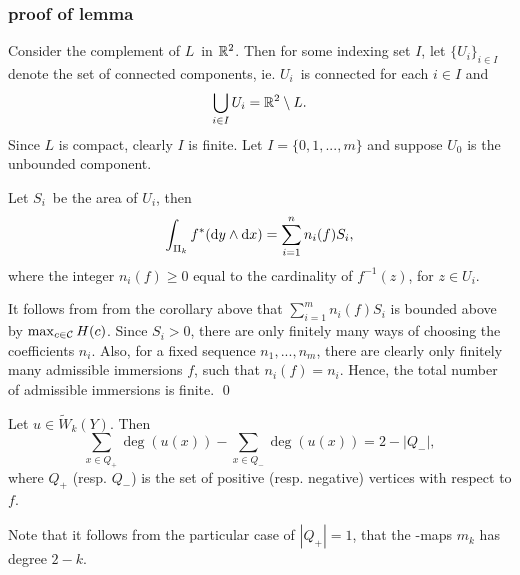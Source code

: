 \subsubsection{proof of lemma }
Consider the complement of $L$ in $\mathbb{R}^2$. Then for some indexing set $I$, let
$\{U_i\}_{i\in I}$ denote the set of connected components, ie. $U_i$ is
connected for each $i\in I$ and 
\[ \bigcup_{i \in I} U_i = \mathbb{R}^2 \setminus L. \]
Since $L$ is compact, clearly $I$ is finite. Let $I = \{0,1,...,m\}$ and suppose
$U_0$ is the unbounded component.  

Let $S_i$ be the area of $U_i$, then 
\[ \int_{\Pi_k} f^*(\mathrm{d} y \wedge \mathrm{d} x) = \sum_{i=1}^n n_i(f) S_i, \] 
where the integer $n_i(f) \ge 0$ equal to the cardinality of
$f^{-1}(z)$, for $z \in U_i$.

It follows from from the corollary above that $\sum_{i=1}^m n_i(f) S_i$ is
bounded above by $\max_{c\in \mathcal{C}} H(c)$. Since $S_i > 0$, there are only finitely many
ways of choosing the coefficients $n_i$. Also, for a fixed sequence $n_1, ...,
n_m$, there are clearly only finitely many admissible immersions $f$, such that
$n_i(f) = n_i$. Hence, the total number of admissible immersions is finite.
\qed %

\begin{lemma}
\label{prop:deg_sum}
Let $u \in \tilde{W}_k (Y)$. Then 
\[ \sum_{x \in Q_+} \deg(u(x)) - \sum_{x \in Q_-} \deg(u(x)) = 2 - |Q_-|, \]
where $Q_+$ (resp. $Q_-$) is the set of positive (resp. negative) vertices with respect to $f$.
\end{lemma}

Note that it follows from the particular case of $|Q_+| = 1$, that the
\Ainf-maps $m_k$ has degree $2 - k$. 

